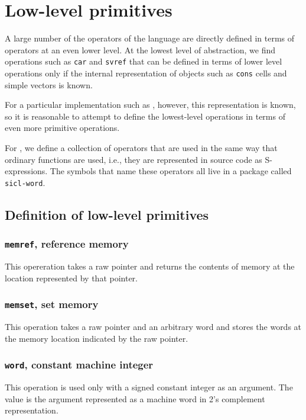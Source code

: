 \chapter{Low-level primitives}
\label{chap-low-level-primitives}

A large number of the operators of the \commonlisp{} language are directly
defined in terms of operators at an even lower level.  At the lowest
level of abstraction, we find operations such as \texttt{car} and
\texttt{svref} that can be defined in terms of lower level operations
only if the internal representation of objects such as \texttt{cons}
cells and simple vectors is known.

For a particular implementation such as \sysname{}, however, this
representation is known, so it is reasonable to attempt to define the
lowest-level \commonlisp{} operations in terms of even more primitive
operations. 

For \sysname{}, we define a collection of operators that are used
in the same way that ordinary \commonlisp{} functions are used, i.e., they are
represented in source code as S-expressions.  The symbols that name
these operators all live in a package called \texttt{sicl-word}.  

\section{Definition of low-level primitives}

\subsection{\texttt{memref}, reference memory}

This opereration takes a raw pointer and returns the contents of
memory at the location represented by that pointer.

\subsection{\texttt{memset}, set memory}

This operation takes a raw pointer and an arbitrary word and stores
the words at the memory location indicated by the raw pointer.

\subsection{\texttt{word}, constant machine integer}

This operation is used only with a signed constant integer as an
argument.  The value is the argument represented as a machine word in
2's complement representation.


